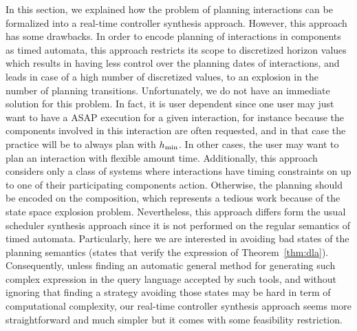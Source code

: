 In this section, we explained how the problem of planning interactions can be formalized into
a real-time controller synthesis approach. However, this approach has some drawbacks.
In order to encode planning of interactions in components as timed automata, this approach
restricts its scope to discretized horizon values which results in having less control
over the planning dates of interactions, and leads in case of a high number of discretized 
values, to an explosion in the number of planning transitions. Unfortunately, we do not 
have an immediate solution for this problem. In fact, it is user dependent since one user may 
just want to have a ASAP execution for a given interaction, for instance because the components
involved in this interaction are often requested, and in that case the practice will be to 
always plan with $h_{\min}$. In other cases, the user may want to plan an interaction with 
flexible amount time.
Additionally, this approach considers only a class of systems where interactions have timing 
constraints on up to one of their participating components action. Otherwise, the planning 
should be encoded on the composition, which represents a tedious work because of the state 
space explosion problem. Nevertheless, this approach differs form the usual scheduler 
synthesis approach since it is not performed on the regular semantics of timed automata. 
Particularly, here we are interested in avoiding bad states of the planning semantics 
(states that verify the expression of Theorem~\ref{thm:dla}). Consequently, unless finding an 
automatic general method for generating such complex expression in the query language accepted 
by such tools, and without ignoring that finding a strategy avoiding those states 
may be hard in term of computational complexity, our real-time controller synthesis approach 
seems more straightforward and much simpler but it comes with some feasibility restriction.













